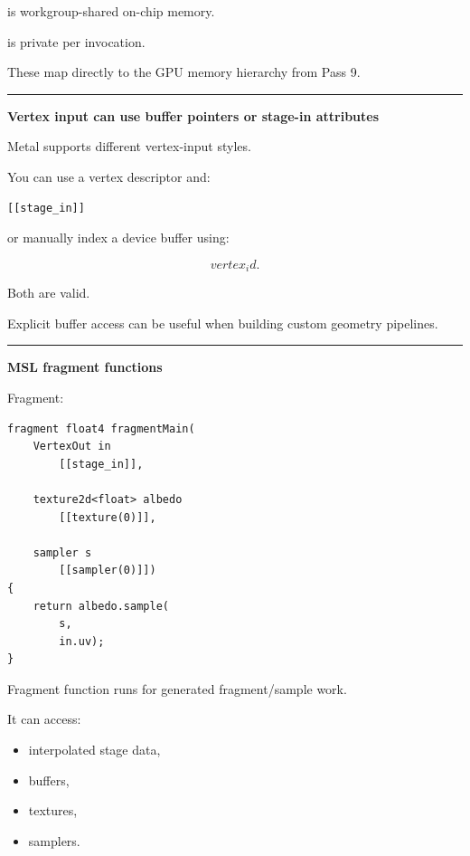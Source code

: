  is workgroup-shared on-chip memory.

 is private per invocation.

These map directly to the GPU memory hierarchy from Pass 9.

\begin{center}\rule{0.5\linewidth}{0.5pt}\end{center}

\textbf{Vertex input can use buffer pointers or stage-in attributes}

Metal supports different vertex-input styles.

You can use a vertex descriptor and:

\begin{verbatim}
[[stage_in]]
\end{verbatim}

or manually index a device buffer using:

\[
vertex_id.
\]

Both are valid.

Explicit buffer access can be useful when building custom geometry pipelines.

\begin{center}\rule{0.5\linewidth}{0.5pt}\end{center}

\textbf{MSL fragment functions}

Fragment:

\begin{verbatim}
fragment float4 fragmentMain(
    VertexOut in
        [[stage_in]],

    texture2d<float> albedo
        [[texture(0)]],

    sampler s
        [[sampler(0)]])
{
    return albedo.sample(
        s,
        in.uv);
}
\end{verbatim}

Fragment function runs for generated fragment/sample work.

It can access:

\begin{itemize}
\tightlist
\item
  interpolated stage data,
\item
  buffers,
\item
  textures,
\item
  samplers.
\end{itemize}


